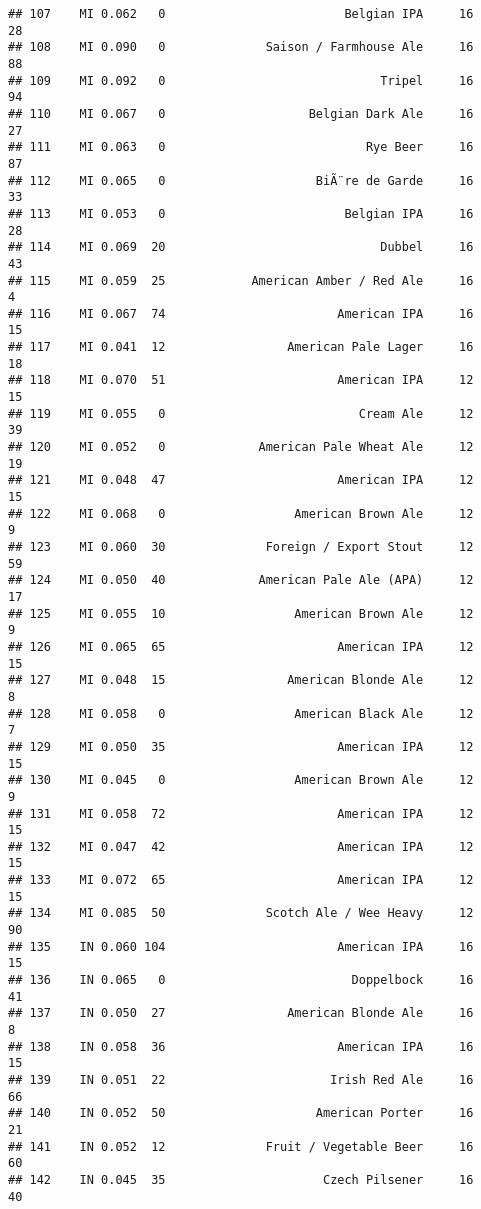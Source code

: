 \documentclass[
]{article}
\begin{document}
\begin{verbatim}
## 107    MI 0.062   0                         Belgian IPA     16      28
## 108    MI 0.090   0              Saison / Farmhouse Ale     16      88
## 109    MI 0.092   0                              Tripel     16      94
## 110    MI 0.067   0                    Belgian Dark Ale     16      27
## 111    MI 0.063   0                            Rye Beer     16      87
## 112    MI 0.065   0                     BiÃ¨re de Garde     16      33
## 113    MI 0.053   0                         Belgian IPA     16      28
## 114    MI 0.069  20                              Dubbel     16      43
## 115    MI 0.059  25            American Amber / Red Ale     16       4
## 116    MI 0.067  74                        American IPA     16      15
## 117    MI 0.041  12                 American Pale Lager     16      18
## 118    MI 0.070  51                        American IPA     12      15
## 119    MI 0.055   0                           Cream Ale     12      39
## 120    MI 0.052   0             American Pale Wheat Ale     12      19
## 121    MI 0.048  47                        American IPA     12      15
## 122    MI 0.068   0                  American Brown Ale     12       9
## 123    MI 0.060  30              Foreign / Export Stout     12      59
## 124    MI 0.050  40             American Pale Ale (APA)     12      17
## 125    MI 0.055  10                  American Brown Ale     12       9
## 126    MI 0.065  65                        American IPA     12      15
## 127    MI 0.048  15                 American Blonde Ale     12       8
## 128    MI 0.058   0                  American Black Ale     12       7
## 129    MI 0.050  35                        American IPA     12      15
## 130    MI 0.045   0                  American Brown Ale     12       9
## 131    MI 0.058  72                        American IPA     12      15
## 132    MI 0.047  42                        American IPA     12      15
## 133    MI 0.072  65                        American IPA     12      15
## 134    MI 0.085  50              Scotch Ale / Wee Heavy     12      90
## 135    IN 0.060 104                        American IPA     16      15
## 136    IN 0.065   0                          Doppelbock     16      41
## 137    IN 0.050  27                 American Blonde Ale     16       8
## 138    IN 0.058  36                        American IPA     16      15
## 139    IN 0.051  22                       Irish Red Ale     16      66
## 140    IN 0.052  50                     American Porter     16      21
## 141    IN 0.052  12              Fruit / Vegetable Beer     16      60
## 142    IN 0.045  35                      Czech Pilsener     16      40

\end{verbatim}
\end{document}
